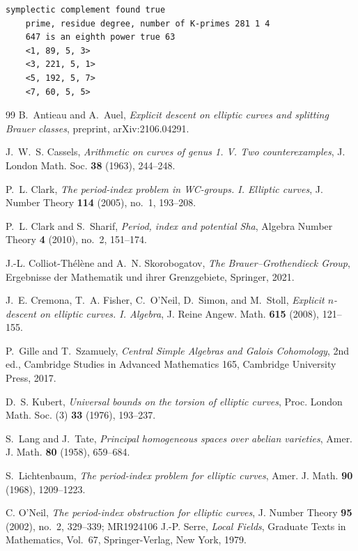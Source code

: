 \documentclass[11pt,a4paper]{amsart}
\theoremstyle{definition}
\numberwithin{equation}{section}
\begin{document}
\begin{lstlisting}[style=magma]
	symplectic complement found true
	prime, residue degree, number of K-primes 281 1 4
	647 is an eighth power true 63
	<1, 89, 5, 3>
	<3, 221, 5, 1>
	<5, 192, 5, 7>
	<7, 60, 5, 5>
\end{lstlisting}

\begin{thebibliography}{99}
B.~Antieau and A.~Auel,
\emph{Explicit descent on elliptic curves and splitting Brauer classes},
preprint, arXiv:2106.04291.

J.~W.~S. Cassels,
\emph{Arithmetic on curves of genus 1. V. Two counterexamples},
J. London Math. Soc. {\bf 38} (1963), 244--248.

P.~L. Clark,
\emph{The period-index problem in WC-groups. I. Elliptic curves},
J. Number Theory \textbf{114} (2005), no.~1, 193--208.

P.~L. Clark and S.~Sharif,
\emph{Period, index and potential Sha},
Algebra Number Theory \textbf{4} (2010), no.~2, 151--174.

J.-L. Colliot-Th\'el\`ene and A.~N. Skorobogatov,
\emph{The Brauer--Grothendieck Group},
Ergebnisse der Mathematik und ihrer Grenzgebiete, Springer, 2021.

J.~E. Cremona, T.~A. Fisher, C.~O'Neil, D.~Simon, and M.~Stoll,
\emph{Explicit $n$-descent on elliptic curves. I. Algebra},
J. Reine Angew. Math. \textbf{615} (2008), 121--155.

P.~Gille and T.~Szamuely,
\emph{Central Simple Algebras and Galois Cohomology},
2nd ed., Cambridge Studies in Advanced Mathematics 165,
Cambridge University Press, 2017.

D.~S. Kubert,
\emph{Universal bounds on the torsion of elliptic curves},
Proc. London Math. Soc. (3) \textbf{33} (1976), 193--237.

S.~Lang and J.~Tate,
\emph{Principal homogeneous spaces over abelian varieties},
Amer. J. Math. \textbf{80} (1958), 659--684.

S.~Lichtenbaum,
\emph{The period-index problem for elliptic curves},
Amer. J. Math. \textbf{90} (1968), 1209--1223.

C. O'Neil, \emph{The period-index obstruction for elliptic curves}, J. Number Theory {\bf 95} (2002), no.~2, 329--339; MR1924106
J.-P. Serre,
\emph{Local Fields},
Graduate Texts in Mathematics, Vol.~67,
Springer-Verlag, New York, 1979.


\end{thebibliography}
\end{document}
